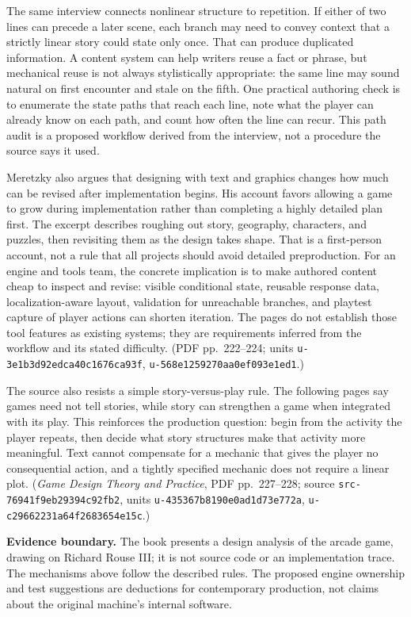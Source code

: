 The same interview connects nonlinear structure to repetition. If either of two lines can precede a later scene, each branch may need to convey context that a strictly linear story could state only once. That can produce duplicated information. A content system can help writers reuse a fact or phrase, but mechanical reuse is not always stylistically appropriate: the same line may sound natural on first encounter and stale on the fifth. One practical authoring check is to enumerate the state paths that reach each line, note what the player can already know on each path, and count how often the line can recur. This path audit is a proposed workflow derived from the interview, not a procedure the source says it used.

Meretzky also argues that designing with text and graphics changes how much can be revised after implementation begins. His account favors allowing a game to grow during implementation rather than completing a highly detailed plan first. The excerpt describes roughing out story, geography, characters, and puzzles, then revisiting them as the design takes shape. That is a first-person account, not a rule that all projects should avoid detailed preproduction. For an engine and tools team, the concrete implication is to make authored content cheap to inspect and revise: visible conditional state, reusable response data, localization-aware layout, validation for unreachable branches, and playtest capture of player actions can shorten iteration. The pages do not establish those tool features as existing systems; they are requirements inferred from the workflow and its stated difficulty. (PDF pp.~222--224; units \texttt{u-3e1b3d92edca40c1676ca93f}, \texttt{u-568e1259270aa0ef093e1ed1}.)

The source also resists a simple story-versus-play rule. The following pages say games need not tell stories, while story can strengthen a game when integrated with its play. This reinforces the production question: begin from the activity the player repeats, then decide what story structures make that activity more meaningful. Text cannot compensate for a mechanic that gives the player no consequential action, and a tightly specified mechanic does not require a linear plot. (\emph{Game Design Theory and Practice}, PDF pp.~227--228; source \texttt{src-76941f9eb29394c92fb2}, units \texttt{u-435367b8190e0ad1d73e772a}, \texttt{u-c29662231a64f2683654e15c}.)

\textbf{Evidence boundary.} The book presents a design analysis of the arcade game, drawing on Richard Rouse III; it is not source code or an implementation trace. The mechanisms above follow the described rules. The proposed engine ownership and test suggestions are deductions for contemporary production, not claims about the original machine's internal software.

